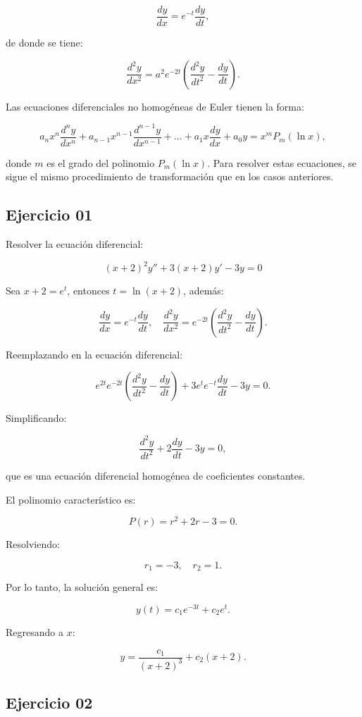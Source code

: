 \[
    \frac{dy}{dx} = e^{-t} \frac{dy}{dt},
\]

de donde se tiene:

\[
    \frac{d^2 y}{dx^2} = a^2 e^{-2t} \left( \frac{d^2 y}{dt^2} - \frac{dy}{dt} \right).
\]

Las ecuaciones diferenciales no homogéneas de Euler tienen la forma:

\[
    a_n x^n \frac{d^n y}{dx^n} + a_{n-1} x^{n-1} \frac{d^{n-1} y}{dx^{n-1}} + \dots + a_1 x \frac{dy}{dx} + a_0 y = x^m P_m (\ln x),
\]

donde $m$ es el grado del polinomio $P_m (\ln x)$. Para resolver estas ecuaciones, se sigue el mismo procedimiento de transformación que en los casos anteriores.



\subsection{Ejercicio  01}

Resolver la ecuación diferencial:

\[
    (x+2)^2 y'' + 3(x+2)y' - 3y = 0
\]

Sea $x + 2 = e^t$, entonces $t = \ln (x+2)$, además:

\[
    \frac{dy}{dx} = e^{-t} \frac{dy}{dt}, \quad \frac{d^2 y}{dx^2} = e^{-2t} \left( \frac{d^2 y}{dt^2} - \frac{dy}{dt} \right).
\]

Reemplazando en la ecuación diferencial:

\[
    e^{2t} e^{-2t} \left( \frac{d^2 y}{dt^2} - \frac{dy}{dt} \right) + 3e^t e^{-t} \frac{dy}{dt} - 3y = 0.
\]

Simplificando:

\[
    \frac{d^2 y}{dt^2} + 2 \frac{dy}{dt} - 3y = 0,
\]

que es una ecuación diferencial homogénea de coeficientes constantes.

El polinomio característico es:

\[
    P(r) = r^2 + 2r - 3 = 0.
\]

Resolviendo:

\[
    r_1 = -3, \quad r_2 = 1.
\]

Por lo tanto, la solución general es:

\[
    y(t) = c_1 e^{-3t} + c_2 e^t.
\]

Regresando a $x$:

\[
    y = \frac{c_1}{(x+2)^3} + c_2 (x+2).
\]

\subsection{Ejercicio 02}

